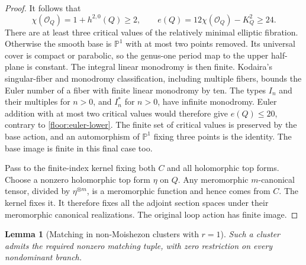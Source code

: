 \documentclass[11pt,letterpaper]{article}
\newcommand{\PP}{\mathbb{P}}
\newcommand{\OO}{\mathcal{O}}
\newtheorem{lemma}[theorem]{Lemma}
\theoremstyle{definition}
\theoremstyle{remark}
\begin{document}
\begin{proof}
It follows that
\begin{equation}
 \label{floor:euler-lower}
 \chi(\OO_Q)=1+h^{2,0}(Q)\ge2,
 \qquad e(Q)=12\chi(\OO_Q)-K_Q^2\ge24.
\end{equation}
There are at least three critical values of the relatively
minimal elliptic fibration.  Otherwise the smooth base is
$\PP^1$ with at most two points removed.  Its universal cover
is compact or parabolic, so the genus-one period map to the
upper half-plane is constant.  The integral linear monodromy
is then finite.  Kodaira's singular-fiber and monodromy
classification, including multiple fibers, bounds the Euler
number of a fiber with finite linear monodromy by ten.
The types $I_n$ and their multiples for $n>0$, and $I_n^*$
for $n>0$, have infinite monodromy.  Euler addition with at
most two critical values would therefore give $e(Q)\le20$,
contrary to \eqref{floor:euler-lower}.  The finite set of
critical values is preserved by the base action, and an
automorphism of $\PP^1$ fixing three points is the identity.
The base image is finite in this final case too.

Pass to the finite-index kernel fixing both $C$ and all
holomorphic top forms.  Choose a nonzero holomorphic top form
$\eta$ on $Q$.  Any meromorphic $m$-canonical tensor, divided
by $\eta^{\otimes m}$, is a meromorphic function and hence
comes from $C$.  The kernel fixes it.  It therefore fixes all
the adjoint section spaces under their meromorphic canonical
realizations.  The original loop action has finite image.
\end{proof}

\begin{lemma}[Matching in non-Moishezon clusters with $r=1$]
\label{floor:nonprojective-r1}
Such a cluster admits the required nonzero matching tuple,
with zero restriction on every nondominant branch.
\end{lemma}
\end{document}
